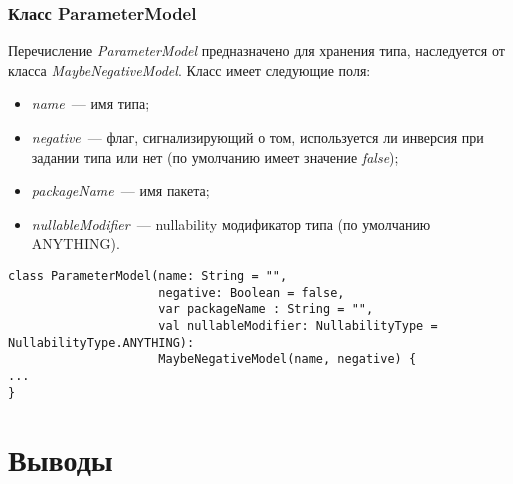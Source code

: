 \subsubsection{Класс ParameterModel}
\label{ssub:ParameterModel}
Перечисление \textit{ParameterModel} предназначено для хранения типа,
наследуется от класса \textit{MaybeNegativeModel}.
Класс имеет следующие поля:
\begin{itemize}
	\item \textit{name}~--- имя типа;
	\item \textit{negative}~--- флаг, сигнализирующий о том, используется ли
		  инверсия при задании типа или нет (по умолчанию имеет значение
		  \textit{false});
	\item \textit{packageName}~--- имя пакета;
	\item \textit{nullableModifier}~--- nullability модификатор типа (по
		  умолчанию ANYTHING).
\end{itemize}

\begin{lstlisting}[style={java}, label={lst:ParameterModel},
  caption={Класс ParameterModel}]
class ParameterModel(name: String = "",
                     negative: Boolean = false,
                     var packageName : String = "",
                     val nullableModifier: NullabilityType = NullabilityType.ANYTHING):
                     MaybeNegativeModel(name, negative) {
...
}
\end{lstlisting}
\section{Выводы}
\label{sec:development_conclusion}

